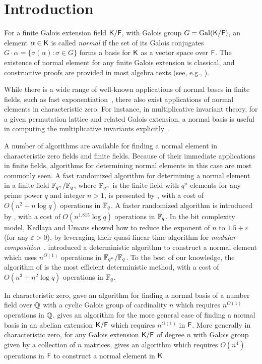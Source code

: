 \section{Introduction}

For a finite Galois extension field ${\mathsf{K}}/{\mathsf{F}}$, with Galois group $G =
\mathrm{Gal}({\mathsf{K}}/{\mathsf{F}})$, an element $\alpha \in {\mathsf{K}}$ is called
\emph{normal} if the set of its Galois conjugates $G \cdot \alpha =
\{ \sigma(\alpha): \sigma\in G\}$ forms a basis for ${\mathsf{K}}$ as a vector space over
${\mathsf{F}}$. The existence of normal element for any finite Galois extension
is classical, and constructive proofs are provided in most algebra texts
(see, e.g., \citep[Section 6.13]{Lang}).
 
While there is a wide range of well-known applications of normal bases in
finite fields, such as fast exponentiation~\citep{GaGaPaSh00}, there also
exist applications of normal elements in characteristic zero.  For instance,
in multiplicative invariant theory, for a given permutation lattice and
related Galois extension, a normal basis is useful in computing the
multiplicative invariants explicitly~\citep{Jam18}.

A number of algorithms are available for finding a normal element in
characteristic zero fields and finite fields.  Because of their immediate
applications in finite fields, algorithms for determining normal elements
in this case are most commonly seen.  A fast randomized algorithm for
determining a normal element in a finite field ${\mathbb{F}}_{q^n}/{\mathbb{F}}_q$, where
${\mathbb{F}}_{q^n}$ is the finite field with $q^n$ elements for any prime power $q$
and integer $n>1$, is presented by , with a cost of
$O(n^2+n\log q)$ operations in ${\mathbb{F}}_q$.  A faster randomized algorithm is
introduced by , with a cost of $O(n^{1.815}\log q)$
operations in ${\mathbb{F}}_q$.  In the bit complexity model, Kedlaya and Umans showed
how to reduce the exponent of $n$ to $1.5+\varepsilon$ (for any
$\varepsilon > 0$), by leveraging their quasi-linear time algorithm for
{\em modular composition}~\citep{KeUm11}. \cite{LenstraNormal} introduced a
deterministic algorithm to construct a normal element which uses $n^{O(1)}$
operations in ${\mathbb{F}}_{q^n}/{\mathbb{F}}_q$.  To the best of our knowledge, the
algorithm of \cite{AugCam94} is the most efficient deterministic method,
with a cost of $O(n^3+n^2\log q)$ operations in ${\mathbb{F}}_q$.

In characteristic zero, \cite{SchSte93} gave an algorithm for finding
a normal basis of a number field over $\mathbb{Q}$ with a cyclic Galois group
of cardinality $n$ which requires $n^{O(1)}$ operations in $\mathbb{Q}$.
\cite{Pol94} gives an algorithm for the more general case of finding
a normal basis in an abelian extension ${\mathsf{K}}/{\mathsf{F}}$ which requires
$n^{O(1)}$ in ${\mathsf{F}}$.  More generally in characteristic zero, for any
Galois extension ${\mathsf{K}}/{\mathsf{F}}$ of degree $n$ with Galois group given by a
collection of $n$ matrices, \cite{Girstmair} gives an algorithm which
requires $O(n^4)$ operations in ${\mathsf{F}}$ to construct a normal element in
${\mathsf{K}}$.


